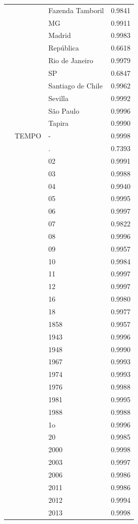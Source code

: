 \begin{table}
\begin{tabular}{llp{6cm}r}
 &  & Fazenda Tamboril & 0.9841 \\
 &  & MG & 0.9911 \\
 &  & Madrid & 0.9983 \\
 &  & República & 0.6618 \\
 &  & Rio de Janeiro & 0.9979 \\
 &  & SP & 0.6847 \\
 &  & Santiago de Chile & 0.9962 \\
 &  & Sevilla & 0.9992 \\
 &  & São Paulo & 0.9996 \\
 &  & Tapira & 0.9990 \\
 & TEMPO & - & 0.9998 \\
 &  & . & 0.7393 \\
 &  & 02 & 0.9991 \\
 &  & 03 & 0.9988 \\
 &  & 04 & 0.9940 \\
 &  & 05 & 0.9995 \\
 &  & 06 & 0.9997 \\
 &  & 07 & 0.9822 \\
 &  & 08 & 0.9996 \\
 &  & 09 & 0.9957 \\
 &  & 10 & 0.9984 \\
 &  & 11 & 0.9997 \\
 &  & 12 & 0.9997 \\
 &  & 16 & 0.9980 \\
 &  & 18 & 0.9977 \\
 &  & 1858 & 0.9957 \\
 &  & 1943 & 0.9996 \\
 &  & 1948 & 0.9990 \\
 &  & 1967 & 0.9993 \\
 &  & 1974 & 0.9993 \\
 &  & 1976 & 0.9988 \\
 &  & 1981 & 0.9995 \\
 &  & 1988 & 0.9988 \\
 &  & 1o & 0.9996 \\
 &  & 20 & 0.9985 \\
 &  & 2000 & 0.9998 \\
 &  & 2003 & 0.9997 \\
 &  & 2006 & 0.9986 \\
 &  & 2011 & 0.9986 \\
 &  & 2012 & 0.9994 \\
 &  & 2013 & 0.9998 \\

\end{tabular}
\end{table}
